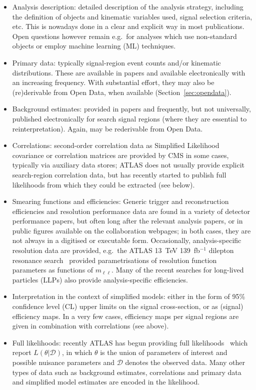 \documentclass[a4paper,aps,prd,longbibliography,notitlepage,showpacs,amsmath,amssymb,superscriptaddress,nofootinbib,floatfix,11pt,preprintnumbers]{revtex4-1-mod}
\newcommand{\eg}{e.g.\xspace}
\begin{document}
\begin{itemize}
    \item Analysis description: detailed description of the analysis  strategy, including the definition of objects and kinematic variables used, signal selection criteria, etc.
    This is nowadays done in a clear and explicit way in most publications. Open questions however remain \eg~for analyses which use non-standard objects or employ machine learning (ML) techniques.
    \item Primary data: typically signal-region event counts and/or kinematic distributions.
    These are available in papers and available electronically with an increasing frequency. With substantial effort, they may also be (re)derivable from Open Data, when available (Section~\ref{sec:opendata}).
    \item Background estimates: provided in papers and frequently, but not universally, published electronically for search signal regions (where they are essential to reinterpretation). Again, may be rederivable from Open Data.
    \item Correlations: second-order correlation data as Simplified Likelihood~\cite{CMS:2242860} covariance or correlation matrices are provided by CMS in some cases, typically via auxiliary data stores; ATLAS does not usually provide explicit search-region correlation data, but has recently started to publish full likelihoods from which they could be extracted (see below).
    \item Smearing functions and efficiencies:
    Generic trigger and reconstruction efficiencies and resolution performance data are found in a variety of detector performance papers, but often long after the relevant analysis papers, or in public figures available on the collaboration webpages; in both cases, they are not always in a digitised or executable form.
    Occasionally, analysis-specific resolution data are provided,
    \eg~the ATLAS 13~TeV 139~fb$^{-1}$ dilepton resonance search~\cite{Aad:2019fac} provided parametrisations of resolution function parameters as functions of $m_{\ell\ell}$.
    Many of the recent searches for long-lived particles (LLPs) also provide analysis-specific efficiencies.
    \item Interpretation in the context of simplified models: either in the form of 95\% confidence level (CL) upper limits on the signal cross-section, or as (signal) efficiency maps. In a very few cases, efficiency maps per signal regions are given in combination with correlations (see above).
    \item Full likelihoods: recently ATLAS has begun providing full likelihoods~\cite{ATL-PHYS-PUB-2019-029} which report $L(\theta|\mathcal{D})$, in which  $\theta$ is the union of parameters of interest and possible nuisance parameters and $\mathcal{D}$ denotes the observed data. Many other types of data such as background estimates, correlations and primary data and simplified model estimates are encoded in the likelihood.

\end{itemize}
\end{document}
